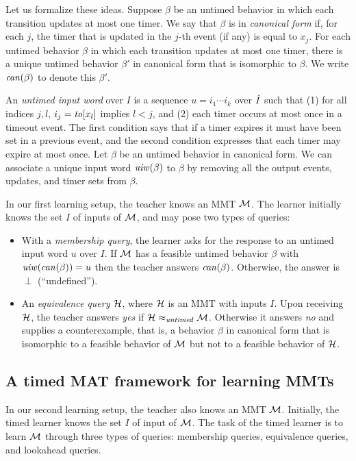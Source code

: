 Let us formalize these ideas.
Suppose $\beta$ be an untimed behavior in which each transition updates at most one timer.
We say that $\beta$ is in \emph{canonical form} if, for each $j$, the timer that is updated in the $j$-th event
(if any) is equal to $x_j$.
For each untimed behavior $\beta$ in which each transition updates at most one timer, there is a unique untimed behavior
$\beta'$ in canonical form that is isomorphic to $\beta$.
We write $\mathit{can}({\beta})$ to denote this $\beta'$.

An \emph{untimed input word} over $I$ is a sequence $u = i_1 \cdots i_k$ over $\hat{I}$ such that (1)
for all indices $j, l$, $i_j = \mathit{to}[x_l]$ implies $l < j$, and (2) each timer occurs at most once in a timeout event.
The first condition  says that if a timer expires it must have been set in a previous event, and the second condition  expresses that
each timer may expire at most once.
Let $\beta$ be an untimed behavior in canonical form.
We can associate a unique input word $\mathit{uiw}(\beta)$ to $\beta$ by removing all the output events,
updates, and timer sets from $\beta$.

In our first learning setup, the teacher knows an MMT ${\cal M}$.
The learner initially knows the set $I$ of inputs of ${\cal M}$, and may pose two types of queries:
\begin{itemize}
\item
With a \emph{membership query}, the learner asks for the response to an untimed input word $u$ over $I$.
If ${\cal M}$ has a feasible untimed behavior $\beta$ with $\mathit{uiw}(\mathit{can}({\beta})) = u$ then the teacher answers
$\mathit{can}({\beta})$. Otherwise, the answer is $\perp$ (``undefined'').
\item
An \emph{equivalence query} ${\cal H}$, where ${\cal H}$ is an MMT with inputs $I$.
Upon receiving ${\cal H}$, the teacher answers \emph{yes} if ${\cal H} \approx_{\mathit{untimed}} {\cal M}$.
Otherwise it answers \emph{no} and supplies a counterexample, that is, a behavior $\beta$ in canonical form that
is isomorphic to a feasible behavior of ${\cal M}$ but not to a feasible behavior of ${\cal H}$.
\end{itemize}

\subsection{A timed MAT framework for learning MMTs}
In our second learning setup, the teacher also knows an MMT ${\cal M}$.
Initially, the timed learner knows the set $I$ of input of ${\cal M}$.
The task of the timed learner is to learn ${\cal M}$ through three types of queries: membership queries, equivalence queries,
and lookahead queries.

